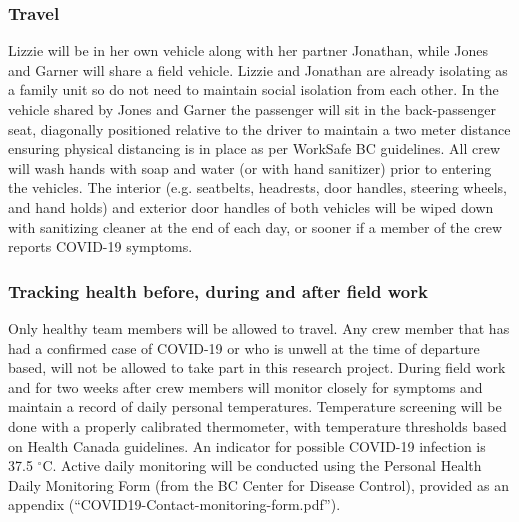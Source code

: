 \documentclass[11pt,letter]{article}
\begin{document}
\subsubsection {Travel}
Lizzie will be in her own vehicle along with her partner Jonathan, while Jones and Garner will share a field vehicle. Lizzie and Jonathan are already isolating as a family unit so do not need to maintain social isolation from each other. In the vehicle shared by Jones and Garner the passenger will sit in the back-passenger seat, diagonally positioned relative to the driver to maintain a two meter distance ensuring physical distancing is in place as per WorkSafe BC guidelines. All crew will wash hands with soap and water (or with hand sanitizer) prior to entering the vehicles. The interior (e.g. seatbelts, headrests, door handles, steering wheels, and hand holds) and exterior door handles of both vehicles will be wiped down with sanitizing cleaner at the end of each day, or sooner if a member of the crew reports COVID-19 symptoms.

\subsubsection {Tracking health before, during and after field work}
Only healthy team members will be allowed to travel. Any crew member that has had a confirmed case of COVID-19 or who is unwell at the time of departure based, will not be allowed to take part in this research project. During field work and for two weeks after crew members will monitor closely for symptoms and maintain a record of daily personal temperatures. Temperature screening will be done with a properly calibrated thermometer, with temperature thresholds based on Health Canada guidelines. An indicator for possible COVID-19 infection is 37.5 $^{\circ}$C. Active daily monitoring will be conducted using the Personal Health Daily Monitoring Form (from the BC Center for Disease Control), provided as an appendix (``COVID19-Contact-monitoring-form.pdf'').
\end{document}
